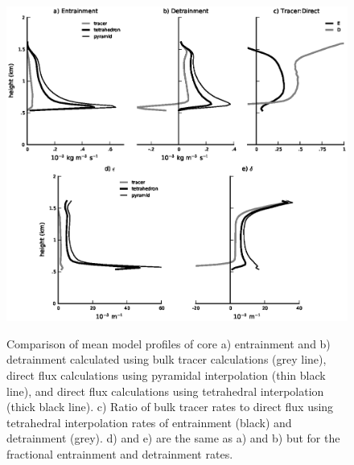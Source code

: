 \documentclass[12pt]{article}
\begin{document}
\begin{figure}[t]
  \noindent\includegraphics[width=40pc,angle=0]{./figures/direct_vs_tracer_core.eps}\\
  \caption{Comparison of mean model profiles of core a) entrainment and b) 
detrainment calculated using bulk tracer calculations (grey line), direct flux
calculations using pyramidal interpolation (thin black line), and direct flux
calculations using tetrahedral interpolation (thick black line).  c) Ratio of 
bulk tracer rates to direct flux using tetrahedral interpolation rates of
entrainment (black) and detrainment (grey).  d) and e) are the same as 
a) and b) but for the fractional entrainment and detrainment rates.}\label{fig:direct_vs_tracer}
\end{figure}
\end{document}
